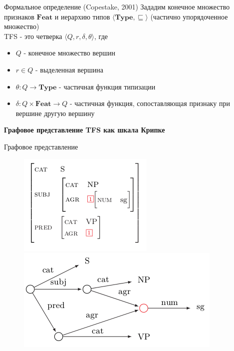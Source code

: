 \documentclass{beamer}
\begin{document}
\begin{frame}{Формальное определение (Copestake, 2001)}
Зададим конечное множество признаков $\textbf{Feat}$ и иерархию типов $\langle \textbf{Type}, \sqsubseteq \rangle$ (частично упорядоченное множество)\\
\bigskip
TFS - это четверка $\langle Q, r, \delta, \theta \rangle$, где
\begin{itemize}
	\item $Q$ - конечное множество вершин
	\item $r \in Q$ - выделенная вершина
	\item $\theta : Q \to \textbf{Type}$ - частичная функция типизации
	\item $\delta : Q \times \textbf{Feat} \to Q$ - частичная функция, сопоставляющая признаку при вершине другую вершину
\end{itemize}
\end{frame}

\begin{frame}{}
\begin{center}
	\textbf{Графовое представление TFS как шкала Крипке}
\end{center}
\end{frame}

\begin{frame}{Графовое представление}
\begin{center}
	\begin{figure}[H]
		\includegraphics[scale=0.5]{tfs_avm.png} 
		\includegraphics[scale=0.5]{tfs_graph.png} 
	\end{figure}
\end{center}
\end{frame}
\end{document}
